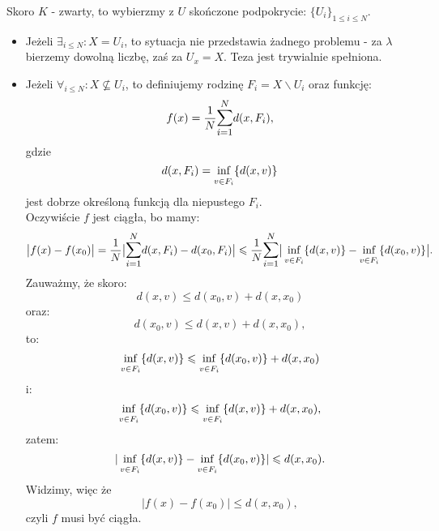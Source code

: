 \documentclass{article}
\newcounter{defi}
\numberwithin{defi}{section}
\numberwithin{defi}{section}
\newcommand{\se}{\subseteq}
\renewcommand{\inf}{\mathop{\mathrm{inf}\vphantom{\mathrm{sup}}}}
\renewcommand{\leq}{\leqslant}
\newcommand{\bsum}[2]{\mathlarger{\sum_{#1}^{#2}}}
\begin{document}
\begin{dow}
    Skoro $K$ - zwarty, to wybierzmy z $U$ skończone podpokrycie: $\{U_i\}_{1 \leq i \leq N}$. 
    \begin{itemize}
        \item Jeżeli $\exists_{i\leq N}: X = U_i$, to sytuacja nie przedstawia żadnego problemu - za $\lambda$ bierzemy dowolną liczbę, zaś za $U_x = X$. Teza jest trywialnie spełniona.

        \item Jeżeli $\forall_{i \leq N}: X \not \se U_i$, to definiujemy rodzinę $F_i = X \backslash U_i$ oraz funkcję: \begin{equation*}
            f(x) = \frac{1}{N} \bsum{i = 1}{N}d(x, F_i),
        \end{equation*} gdzie \begin{equation*}
            d(x, F_i) = \inf_{v \in F_i}\{d(x, v)\}
        \end{equation*} jest dobrze określoną funkcją dla niepustego $F_i$.\\
        Oczywiście $f$ jest ciągła, bo mamy: \begin{equation*}
            \big| f(x) - f(x_0)\big| = \frac{1}{N} \big|\bsum{i = 1}{N} d(x, F_i) - d(x_0, F_i) \big| \leq \frac{1}{N} \bsum{i = 1}{N} \big| \inf_{v \in F_i}\{d(x, v)\} - \inf_{v \in F_i}\{d(x_0, v) \}\big|.
        \end{equation*} Zauważmy, że skoro: \begin{equation*}
            d(x, v)  \leq d(x_0, v) + d(x, x_0) 
        \end{equation*} oraz: \begin{equation*}
            d(x_0, v) \leq d(x, v) + d(x, x_0),
        \end{equation*} to: \begin{equation*}
            \inf_{v \in F_i}\{d(x, v)\} \leq \inf_{v \in F_i}\{d(x_0, v) \} + d(x, x_0)
        \end{equation*} i: \begin{equation*}
            \inf_{v \in F_i}\{d(x_0, v)\} \leq \inf_{v \in F_i}\{d(x, v) \} + d(x, x_0),
        \end{equation*} zatem: \begin{equation*}
            |\inf_{v \in F_i}\{d(x, v)\} - \inf_{v \in F_i}\{d(x_0, v) \}| \leq d(x, x_0).
        \end{equation*} Widzimy, więc że \begin{equation*}
            |f(x) - f(x_0)| \leq d(x, x_0),
        \end{equation*} czyli $f$ musi być ciągła. \\

\end{itemize}
\end{dow}
\end{document}

